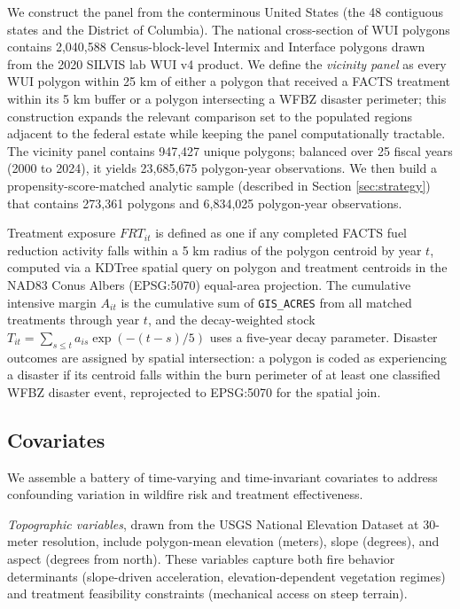 \documentclass[12pt, letterpaper]{article}
\begin{document}
We construct the panel from the conterminous United States (the 48 contiguous states and the District of Columbia). The national cross-section of WUI polygons contains 2{,}040{,}588 Census-block-level Intermix and Interface polygons drawn from the 2020 SILVIS lab WUI v4 product. We define the \textit{vicinity panel} as every WUI polygon within 25 km of either a polygon that received a FACTS treatment within its 5 km buffer or a polygon intersecting a WFBZ disaster perimeter; this construction expands the relevant comparison set to the populated regions adjacent to the federal estate while keeping the panel computationally tractable. The vicinity panel contains 947{,}427 unique polygons; balanced over 25 fiscal years (2000 to 2024), it yields 23{,}685{,}675 polygon-year observations. We then build a propensity-score-matched analytic sample (described in Section \ref{sec:strategy}) that contains 273{,}361 polygons and 6{,}834{,}025 polygon-year observations.

Treatment exposure $FRT_{it}$ is defined as one if any completed FACTS fuel reduction activity falls within a 5 km radius of the polygon centroid by year $t$, computed via a KDTree spatial query on polygon and treatment centroids in the NAD83 Conus Albers (EPSG:5070) equal-area projection. The cumulative intensive margin $A_{it}$ is the cumulative sum of \texttt{GIS\_ACRES} from all matched treatments through year $t$, and the decay-weighted stock $T_{it} = \sum_{s \leq t} a_{is} \exp(-(t-s)/5)$ uses a five-year decay parameter. Disaster outcomes are assigned by spatial intersection: a polygon is coded as experiencing a disaster if its centroid falls within the burn perimeter of at least one classified WFBZ disaster event, reprojected to EPSG:5070 for the spatial join.

\subsection{Covariates}

We assemble a battery of time-varying and time-invariant covariates to address confounding variation in wildfire risk and treatment effectiveness.

\textit{Topographic variables}, drawn from the USGS National Elevation Dataset at 30-meter resolution, include polygon-mean elevation (meters), slope (degrees), and aspect (degrees from north). These variables capture both fire behavior determinants (slope-driven acceleration, elevation-dependent vegetation regimes) and treatment feasibility constraints (mechanical access on steep terrain).
\end{document}
